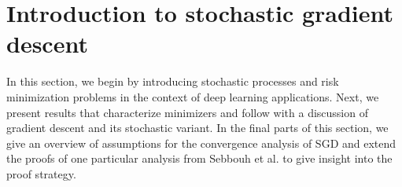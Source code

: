 \documentclass[12pt]{article}
\theoremstyle{definition}
\numberwithin{equation}{section}
\begin{document}
\section{Introduction to stochastic gradient descent}
\label{sec:stochastic_optimization}
In this section, we begin by introducing stochastic processes and risk minimization problems in the context of deep learning applications. Next, we present results that characterize minimizers and follow with a discussion of gradient descent and its stochastic variant. In the final parts of this section, we give an overview of assumptions for the convergence analysis of SGD and extend the proofs of one particular analysis from Sebbouh et al.\cite{sebbouhAlmostSureConvergence2021} to give insight into the proof strategy.
\end{document}
